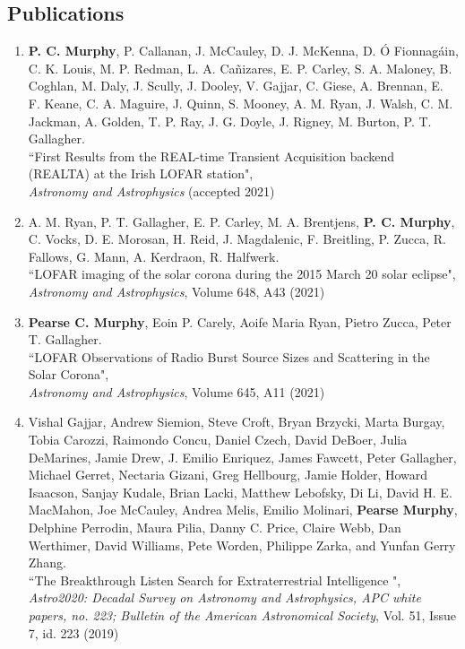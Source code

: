 \begin{singlespace}
\section*{Publications}
\begin{enumerate}
\item \textbf{P. C. Murphy}, P. Callanan, J. McCauley, D. J. McKenna, D. Ó Fionnagáin, C. K. Louis, M. P. Redman, L. A. Cañizares, E. P. Carley, S. A. Maloney, B. Coghlan, M. Daly, J. Scully, J. Dooley, V. Gajjar, C. Giese, A. Brennan, E. F. Keane, C. A. Maguire, J. Quinn, S. Mooney, A. M. Ryan, J. Walsh, C. M. Jackman, A. Golden, T. P. Ray, J. G. Doyle, J. Rigney, M. Burton, P. T. Gallagher.
\\``First Results from the REAL-time Transient Acquisition backend (REALTA) at the Irish LOFAR station",
\\ \textit{Astronomy and Astrophysics} (accepted 2021)
\item A. M. Ryan, P. T. Gallagher, E. P. Carley, M. A. Brentjens,\textbf{ P. C. Murphy}, C. Vocks, D. E. Morosan, H. Reid, J. Magdalenic, F. Breitling, P. Zucca, R. Fallows, G. Mann, A. Kerdraon, R. Halfwerk.
\\``LOFAR imaging of the solar corona during the 2015 March 20 solar eclipse",
\\ \textit{Astronomy and Astrophysics}, Volume 648, A43 (2021)
\item \textbf{Pearse C. Murphy}, Eoin P. Carely, Aoife Maria Ryan, Pietro Zucca, Peter T. Gallagher.
\\ ``LOFAR Observations of Radio Burst Source Sizes and Scattering in the Solar Corona",
\\ \textit{Astronomy and Astrophysics}, Volume 645, A11 (2021)
\item Vishal Gajjar, Andrew Siemion, Steve Croft, Bryan Brzycki, Marta Burgay, Tobia Carozzi, Raimondo Concu, Daniel Czech, David DeBoer, Julia DeMarines, Jamie Drew, J. Emilio Enriquez, James Fawcett, Peter Gallagher, Michael Gerret, Nectaria Gizani, Greg Hellbourg, Jamie Holder, Howard Isaacson, Sanjay Kudale, Brian Lacki, Matthew Lebofsky, Di Li, David H. E. MacMahon, Joe McCauley, Andrea Melis, Emilio Molinari, \textbf{Pearse Murphy}, Delphine Perrodin, Maura Pilia, Danny C. Price, Claire Webb, Dan Werthimer, David Williams, Pete Worden, Philippe Zarka, and Yunfan Gerry Zhang.
\\``The Breakthrough Listen Search for Extraterrestrial Intelligence ",
\\ \textit{Astro2020: Decadal Survey on Astronomy and Astrophysics, APC white papers, no. 223; Bulletin of the American Astronomical Society}, Vol. 51, Issue 7, id. 223 (2019)

\end{enumerate}
\end{singlespace}
